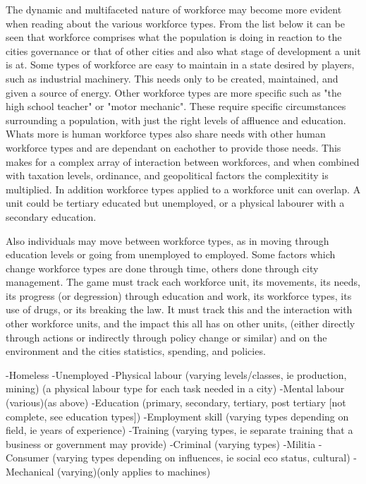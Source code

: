 The dynamic and multifaceted nature of workforce may become more evident when reading about the various workforce types. From the list below it can be seen that workforce comprises what the population is doing in reaction to the cities governance or that of other cities and also what stage of development a unit is at. Some types of workforce are easy to maintain in a state desired by players, such as industrial machinery. This needs only to be created, maintained, and given a source of energy. Other workforce types are more specific such as "the high school teacher" or "motor mechanic". These require specific circumstances surrounding a population, with just the right levels of affluence and education. Whats more is human workforce types also share needs with other human workforce types and are dependant on eachother to provide those needs. This makes for a complex array of interaction between workforces, and when combined with taxation levels, ordinance, and geopolitical factors the complexitity is multiplied. In addition workforce types applied to a workforce unit can overlap. A unit could be tertiary educated but unemployed, or a physical labourer with a secondary education. 

Also individuals may move between workforce types, as in moving through education levels or going from unemployed to employed. Some factors which change workforce types are done through time, others done through city management. The game must track each workforce unit, its movements, its needs, its progress (or degression) through education and work, its workforce types, its use of drugs, or its breaking the law. It must track this and the interaction with other workforce units, and the impact this all has on other units, (either directly through actions or indirectly through policy change or similar) and on the environment and the cities statistics, spending, and policies.


-Homeless
-Unemployed
-Physical labour (varying levels/classes, ie production, mining)
	(a physical labour type for each task needed in a city) 
-Mental labour (various)(as above)
-Education (primary, secondary, tertiary, post tertiary [not complete, see education types])
-Employment skill (varying types depending on field, ie years of experience)
-Training (varying types, ie separate training that a business or government may provide)
-Criminal (varying types)
-Militia
-Consumer (varying types depending on influences, ie social eco status, cultural)
-Mechanical (varying)(only applies to machines)

